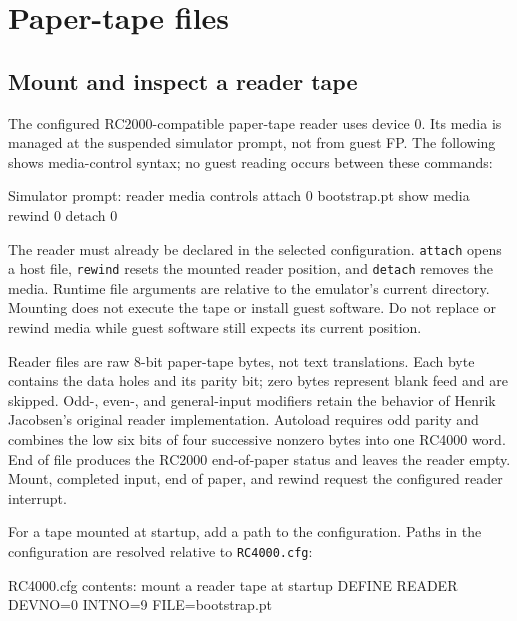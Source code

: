 \chapter{Paper-tape files}\label{paper-tape-files}

\section{Mount and inspect a reader tape}\label{mount-and-inspect-a-reader-tape}

The configured RC2000-compatible paper-tape reader uses device 0. Its media is managed at the suspended simulator prompt, not from guest FP. The following shows media-control syntax; no guest reading occurs between these commands:

\begin{commandexample}{Simulator prompt: reader media controls}
attach 0 bootstrap.pt
show media
rewind 0
detach 0
\end{commandexample}

The reader must already be declared in the selected configuration. \passthrough{\lstinline!attach!} opens a host file, \passthrough{\lstinline!rewind!} resets the mounted reader position, and \passthrough{\lstinline!detach!} removes the media. Runtime file arguments are relative to the emulator's current directory. Mounting does not execute the tape or install guest software. Do not replace or rewind media while guest software still expects its current position.

Reader files are raw 8-bit paper-tape bytes, not text translations. Each byte contains the data holes and its parity bit; zero bytes represent blank feed and are skipped. Odd-, even-, and general-input modifiers retain the behavior of Henrik Jacobsen's original reader implementation. Autoload requires odd parity and combines the low six bits of four successive nonzero bytes into one RC4000 word. End of file produces the RC2000 end-of-paper status and leaves the reader empty. Mount, completed input, end of paper, and rewind request the configured reader interrupt.

For a tape mounted at startup, add a path to the configuration. Paths in the configuration are resolved relative to \passthrough{\lstinline!RC4000.cfg!}:

\begin{commandexample}{RC4000.cfg contents: mount a reader tape at startup}
DEFINE READER DEVNO=0 INTNO=9 FILE=bootstrap.pt
\end{commandexample}

